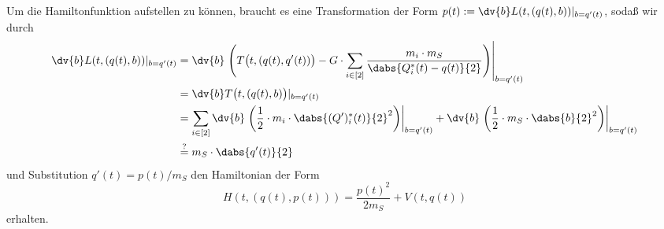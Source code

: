 \documentclass{subfiles}
\begin{document}
    Um die Hamiltonfunktion aufstellen zu können, braucht es eine Transformation der Form $p(t):=\dv{b}L(t,(q(t),b))|_{b=q'(t)}$, sodaß wir durch 
    \begin{align*}
        \dv{b}L(t,(q(t),b))|_{b=q'(t)} &= \dv{b}\left.\Biggl(
            T\bigl(t,(q(t),q'(t))\bigr) - G\cdot\sum_{i\in[2]}\frac{m_i\cdot m_S}{\dabs{Q_i^*(t) - q(t)}{2}}    
        \Biggr)\right|_{b=q'(t)} \\
        &= \dv{b}T\bigl(t,(q(t),b)\bigr)|_{b=q'(t)} \\
        &= \sum_{i\in[2]}\dv{b}\left.\biggl(\frac12\cdot m_i\cdot\dabs{(Q')_i^*(t)}{2}^2\biggr)\right|_{b=q'(t)} + \dv{b}\left.\biggl(\frac12\cdot m_S\cdot\dabs{b}{2}^2\biggr)\right|_{b=q'(t)} \\
        &\stackrel{?}{=}m_S\cdot \dabs{q'(t)}{2}
    \end{align*}
    und Substitution $q'(t) = p(t) / m_S$ den Hamiltonian der Form 
    \[
        H(t,(q(t),p(t))) = \frac{p(t)^2}{2m_S} + V(t,q(t))
    \]
    erhalten.
\end{document}
